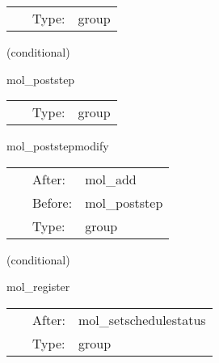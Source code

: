  \begin{tabular*}{160mm}{cll} 
~ & Type:  & group \\ 
\end{tabular*} 


\vspace{5mm}

   (conditional) 

\hspace{5mm} mol\_poststep 

\hspace{5mm}{\it ensure that everything is correct after recovery } 


\hspace{5mm}

 \begin{tabular*}{160mm}{cll} 
~ & Type:  & group \\ 
\end{tabular*} 


\vspace{5mm}


\hspace{5mm} mol\_poststepmodify 

\hspace{5mm}{\it the group for physics thorns to schedule enforcing constraints } 


\hspace{5mm}

 \begin{tabular*}{160mm}{cll} 
~ & After:  & mol\_add \\ 
~ & Before:  & mol\_poststep \\ 
~ & Type:  & group \\ 
\end{tabular*} 


\vspace{5mm}

   (conditional) 

\hspace{5mm} mol\_register 

\hspace{5mm}{\it the group where physics thorns register variables with mol } 


\hspace{5mm}

 \begin{tabular*}{160mm}{cll} 
~ & After:  & mol\_setschedulestatus \\ 
~ & Type:  & group \\ 
\end{tabular*} 


